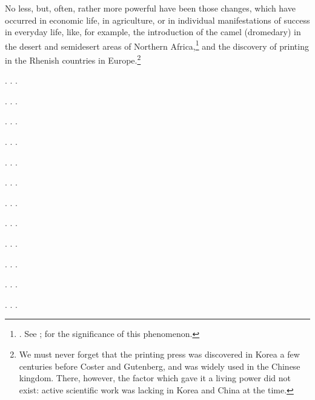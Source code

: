 No less, but, often, rather more powerful have been those changes, which have
occurred in economic life, in agriculture, or in individual manifestations of
success in everyday life, like, for example, the introduction of the camel
(dromedary) in the desert and semidesert areas of Northern Africa,\footnote{%
	\cite[p.~178]{julien1931histoire}.  See
	\cite{gsell1926memoires}; \cite[p.~181]{gautier1927siecles} for
	the significance of this phenomenon.
} and the discovery of printing in the Rhenish countries in Europe.\footnote{%
	We must never forget that the printing press was discovered in Korea a
	few centuries before Coster and Gutenberg, and was widely used in the
	Chinese kingdom.  There, however, the factor which gave it a living
	power did not exist: active scientific work was lacking in Korea and
	China at the time.
}

. . .

\Section %

. . .

\Section %

. . .

\Section %

. . .

\Section %

. . .

\Section %

. . .

\Section %

. . .

\Section %

. . .

\Section %

. . .

\Section %

. . .

\Section %

. . .

\Section %

. . .
